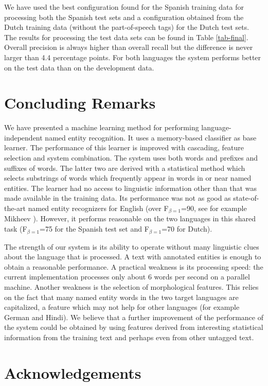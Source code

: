 \documentclass[11pt]{article}
\begin{document}
We have used the best configuration found for the Spanish training
data for processing both the Spanish test sets and a configuration
obtained from the Dutch training data (without the part-of-speech
tags) for the Dutch test sets.
The results for processing the test data sets can be found in Table
\ref{tab-final}.
Overall precision is always higher than overall recall but the
difference is never larger than 4.4 percentage points.
For both languages the system performs better on the test data than
on the development data.

\section{Concluding Remarks}

We have presented a machine learning method for performing 
language-independent named entity recognition.
It uses a memory-based classifier as base learner.
The performance of this learner is improved with cascading, feature
selection and system combination.
The system uses both words and prefixes and suffixes of words.
The latter two are derived with a statistical method which selects
substrings of words which frequently appear in words in or near
named entities.
The learner had no access to linguistic information other than that
was made available in the training data.
Its performance was not as good as state-of-the-art named entity
recognizers for English (over F$_{\beta=1}$=90, see for example
Mikheev ).
However, it performs reasonable on the two languages in this shared
task (F$_{\beta=1}$=75 for the Spanish test set and F$_{\beta=1}$=70
for Dutch).

The strength of our system is its ability to operate without many
linguistic clues about the language that is processed.
A text with annotated entities is enough to obtain a reasonable
performance.
A practical weakness is its processing speed: the current
implementation processes only about 6 words per second on a parallel
machine. 
Another weakness is the selection of morphological features.
This relies on the fact that many named entity words in the two target
languages are capitalized, a feature which may not help for other
languages (for example German and Hindi).
We believe that a further improvement of the performance of the system
could be obtained by using features derived from interesting statistical
information from the training text and perhaps even from other 
untagged text.


\section*{Acknowledgements}
\end{document}
